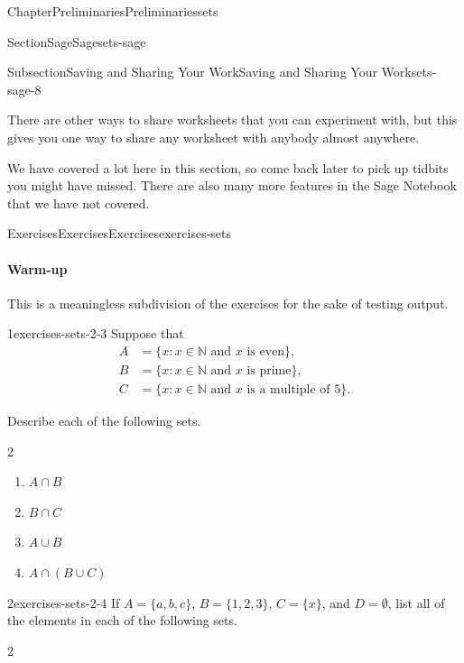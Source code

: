 \documentclass[oneside,10pt,]{book}
\numberwithin{equation}{section}
\begin{document}
\begin{chapterptx}{Chapter}{Preliminaries}{}{Preliminaries}{}{}{sets}
\begin{sectionptx}{Section}{Sage}{}{Sage}{}{}{sets-sage}
\begin{subsectionptx}{Subsection}{Saving and Sharing Your Work}{}{Saving and Sharing Your Work}{}{}{sets-sage-8}
\par
There are other ways to share worksheets that you can experiment with, but this gives you one way to share any worksheet with anybody almost anywhere.%
\par
We have covered a lot here in this section, so come back later to pick up tidbits you might have missed.  There are also many more features in the Sage Notebook that we have not covered.%
\end{subsectionptx}
\end{sectionptx}
%
%
\typeout{************************************************}
\typeout{************************************************}
%
\begin{exercises-section}{Exercises}{Exercises}{}{Exercises}{}{}{exercises-sets}
\paragraph{Warm-up}\hypertarget{exercises-sets-2}{}
This is a meaningless subdivision of the exercises for the sake of testing output.%
\begin{divisionexercise}{1}{}{}{exercises-sets-2-3}%
Suppose that%
\begin{align*}
A & = \{ x : x \in \mathbb N \text{ and } x \text{ is even} \},\\
B & = \{x : x \in \mathbb N \text{ and } x \text{ is prime}\},\\
C & = \{ x : x \in \mathbb N \text{ and } x \text{ is a multiple of 5}\}.
\end{align*}
%
\par
Describe each of the following sets.%
%
\begin{multicols}{2}
\begin{enumerate}[label={(\alph*)}]
\item{}\(\displaystyle A \cap B\)%
\item{}\(\displaystyle B \cap C\)%
\item{}\(\displaystyle A \cup B\)%
\item{}\(\displaystyle A \cap (B \cup C)\)%
\end{enumerate}
\end{multicols}
\end{divisionexercise}%
\begin{divisionexercise}{2}{}{}{exercises-sets-2-4}%
If \(A = \{ a, b, c \}\), \(B = \{ 1, 2, 3 \}\), \(C = \{ x \}\), and \(D = \emptyset\), list all of the elements in each of the following sets.%
%
\begin{multicols}{2}

\end{multicols}
\end{divisionexercise}
\end{exercises-section}
\end{chapterptx}
\end{document}
